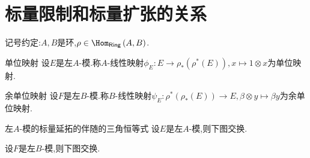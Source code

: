\section{标量限制和标量扩张的关系}

记号约定:$A,B$是环,$\rho\in\Hom_{\mathsf{Ring}}\left(A,B\right)$.

\begin{definition}{单位映射}{}
	设$E$是左$A$-模.称$A$-线性映射$\phi_{E}:E\to\rho_{\ast}\left(\rho^{\ast}\left(E\right)\right),x\mapsto 1\otimes x$为单位映射.
\end{definition}

\begin{definition}{余单位映射}{}
	设$F$是左$B$-模.称$B$-线性映射$\psi_{E}:\rho^{\ast}\left(\rho_{\ast}\left(E\right)\right)\to E,\beta\otimes y\mapsto\beta y$为余单位映射.
\end{definition}

\begin{proposition}{左$A$-模的标量延拓的伴随的三角恒等式}{}
	设$E$是左$A$-模,则下图交换.
	\begin{center}
	\end{center}
\end{proposition}

\begin{proposition}{}{}
	设$F$是左$B$-模,则下图交换.
	\begin{center}
	\end{center}
\end{proposition}

